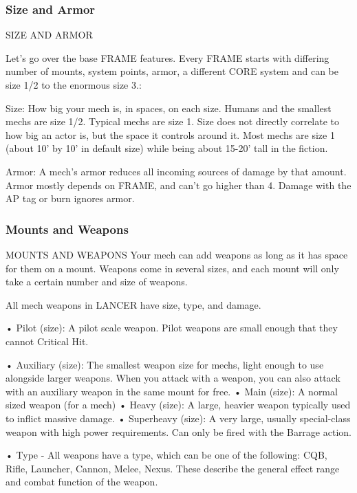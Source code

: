 \subsubsection{Size and Armor}
                                        SIZE AND ARMOR

Let’s go over the base FRAME features. Every FRAME starts with differing number of mounts,
system points, armor, a different CORE system and can be size 1/2 to the enormous size 3.:


Size: How big your mech is, in spaces, on each size. Humans and the smallest mechs are size
1/2. Typical mechs are size 1. Size does not directly correlate to how big an actor is, but the
space it controls around it. Most mechs are size 1 (about 10’ by 10’ in default size) while being
about 15-20’ tall in the fiction.

Armor: A mech’s armor reduces all incoming sources of damage by that amount. Armor mostly
depends on FRAME, and can’t go higher than 4. Damage with the AP tag or burn ignores armor.

\subsubsection{Mounts and Weapons}
                                   MOUNTS AND WEAPONS
Your mech can add weapons as long as it has space for them on a mount. Weapons come in
several sizes, and each mount will only take a certain number and size of weapons.


All mech weapons in LANCER have size, type, and damage.




•  Pilot (size): A pilot scale weapon. Pilot weapons are small enough that they cannot Critical Hit.

•  Auxiliary (size): The smallest weapon size for mechs, light enough to use alongside larger
  weapons. When you attack with a weapon, you can also attack with an auxiliary weapon in the
  same mount for free.
•  Main (size): A normal sized weapon (for a mech)
•  Heavy (size): A large, heavier weapon typically used to inflict massive damage.
•  Superheavy (size): A very large, usually special-class weapon with high power requirements.
  Can only be fired with the Barrage action.

•  Type - All weapons have a type, which can be one of the following: CQB, Rifle, Launcher,
  Cannon, Melee, Nexus. These describe the general effect range and combat function of the
  weapon.


